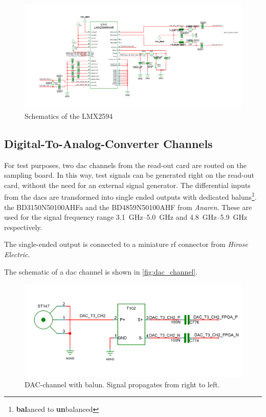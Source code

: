 \begin{figure}[tbh]
	\centering
	\includegraphics[width = \textwidth]{chap/04-work/img/lmx2594}
	\caption{Schematics of the LMX2594}
	\label{fig:lmx2594}
\end{figure}

 



\subsection{Digital-To-Analog-Converter Channels}
For test purposes, two \gls{dac} channels from the read-out card are routed on the sampling board.
In this way, test signals can be generated right on the read-out card, without the need for an external signal generator. 
The differential inputs from the \glspl{dac} are transformed into single ended outputs with dedicated baluns\footnote{\textbf{bal}anced to \textbf{un}balanced}. the BD3150N50100AHFa and the BD4859N50100AHF from \textit{Anaren}. These are used for the signal frequency range \SIrange{3.1}{5.0}{\GHz} and \SIrange{4.8}{5.9}{\GHz} respectively.

The single-ended output is connected to a miniature \gls{rf} connector from \textit{Hirose Electric}.

The schematic of a \gls{dac} channel is shown in \autoref{fig:dac_channel}.
\begin{figure}[tbh]
	\centering
	\includegraphics[width = \textwidth]{chap/04-work/img/dac_channel}
	\caption{DAC-channel with balun. Signal propagates from right to left.}
	\label{fig:dac_channel}
\end{figure}


